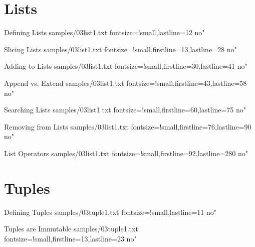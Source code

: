 \documentclass{pyslides}
\begin{document}
\section{Lists}

\begin{frame}[fragile]{Defining Lists}
 samples/03list1.txt fontsize=!small,lastline=12 no"
\end{frame}

\begin{frame}[fragile]{Slicing Lists}
 samples/03list1.txt fontsize=!small,firstline=13,lastline=28 no"
\end{frame}

\begin{frame}[fragile]{Adding to Lists}
 samples/03list1.txt fontsize=!small,firstline=30,lastline=41 no"
\end{frame}

\begin{frame}[fragile]{Append vs. Extend}
 samples/03list1.txt fontsize=!small,firstline=43,lastline=58 no"
\end{frame}

\begin{frame}[fragile]{Searching Lists}
 samples/03list1.txt fontsize=!small,firstline=60,lastline=75 no"
\end{frame}

\begin{frame}[fragile]{Removing from Lists}
 samples/03list1.txt fontsize=!small,firstline=76,lastline=90 no"
\end{frame}

\begin{frame}[fragile]{List Operators}
 samples/03list1.txt fontsize=!small,firstline=92,lastline=280 no"
\end{frame}

\section{Tuples}

\begin{frame}[fragile]{Defining Tuples}
 samples/03tuple1.txt fontsize=!small,lastline=11 no"
\end{frame}

\begin{frame}[fragile]{Tuples are Immutable}
 samples/03tuple1.txt fontsize=!small,firstline=13,lastline=23 no"
\end{frame}
\end{document}
